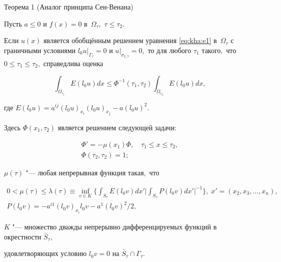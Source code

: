 \begin{newthm}{Теорема 1  (Аналог принципа Сен-Венана)} 

Пусть $ a \leqslant 0  $ и $f(x)=0$ в~$\Omega_\tau,$ $\tau\leq\tau_2.$ 

Если $u(x)$ является обобщённым решением уравнения \eqref{eq:kha:e1} в~$\Omega_\tau$ с граничными условиями $l_0u\big|_{\Gamma_\tau}=0$ и $u\big|_{\sigma_{1,\tau}}=0,$  то для любого $\tau_1$ такого$,$ что $0\leqslant\tau_1\leqslant\tau_2,$  справедлива оценка

\begin{equation}\label{eq:kha:e6}

\int_{\Omega_{\tau _1}}E(l_0u)dx \leqslant \Phi^{-1}(\tau_1,\tau_2) \int _{\Omega_{\tau_2}}E(l_0u)dx,

\end{equation}

где $E(l_0u)=a^{ij}(l_0u)_{x_i}(l_0u)_{x_j}-a(l_0u)^{2}.$ 

Здесь $\Phi(x_1,\tau_2)$ является решением следующей задачи\/{\rm:}

\begin{gather}

\label{eq:kha:e7}

\Phi'=-\mu(x_1)\Phi, \quad \tau_1\leq x\leq\tau_2,

\\

\label{eq:kha:e8}

\Phi(\tau_2,\tau_2)=1;

\end{gather}

$\mu(\tau)$ "--- любая непрерывная функция такая$,$ что 

\begin{gather}

\label{eq:kha:e9}

0<\mu(\tau)\leq \lambda(\tau)\equiv\mathop{\inf }\limits_{v\in K} \biggl\{

\int_{S_\tau}E(l_0v)dx'\biggl|

\int_{S_\tau}P(l_0v)dx'\biggr|^{-1} \biggr\}, \; x'=(x_2, x_3, \dots, x_n),

\\

\label{eq:kha:e10}

P(l_0v)=-a^{i1}(l_0v)_{x_i}l_0v-a^1(l_0v)^2/2,

\end{gather}

$K$ "--- множество дважды непрерывно дифференцируемых функций в окрестности $\bar{S}_\tau,$ 

удовлетворяющих условию $l_0v=0$ на \mbox{$\bar{S}_\tau \cap\Gamma_\tau.$}

\end{newthm}



